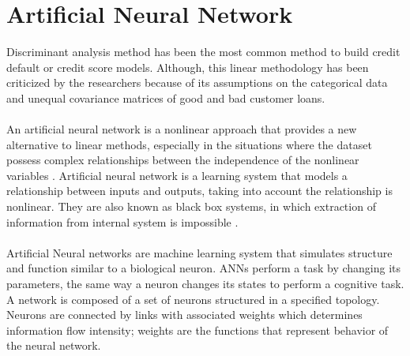\documentclass{article}[]
\begin{document}
\section{Artificial Neural Network}
Discriminant analysis method has been the most common method to build credit default or credit score models. Although, this linear methodology has been criticized by the researchers because of its assumptions on the categorical data and unequal covariance matrices of good and bad customer loans.\\\\
An artificial neural network is a nonlinear approach that provides a new alternative to linear methods, especially in the situations where the dataset possess complex relationships between the independence of the nonlinear variables \cite{atiya2001bankruptcy} \cite{pang2002credit}. Artificial neural network is a learning system that models a relationship between inputs and outputs, taking into account the relationship is nonlinear. They are also known as black box systems, in which extraction of information from internal system is impossible \cite{angelini2008neural}.\\\\
Artificial Neural networks are machine learning system that simulates structure and function similar to a biological neuron. ANNs perform a task by changing its parameters, the same way a neuron changes its states to perform a cognitive task. A network is composed of a set of neurons structured in a specified topology. Neurons are connected by links with associated weights which determines information flow intensity; weights are the functions that represent behavior of the neural network.\\\\
\end{document}
